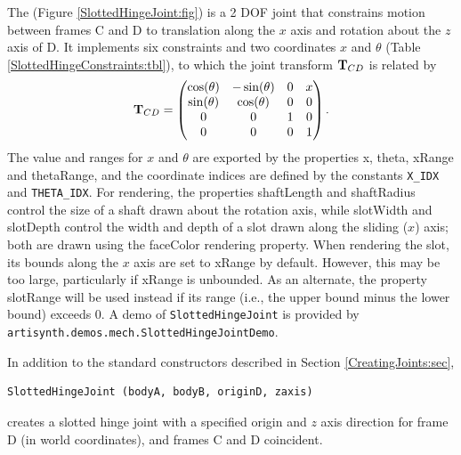 The  
(Figure \ref{SlottedHingeJoint:fig}) is
a 2 DOF joint that constrains motion between frames C and D to
translation along the $x$ axis and rotation about the $z$ axis of D.
It implements six constraints and two coordinates $x$ and $\theta$
(Table \ref{SlottedHingeConstraints:tbl}), to which the joint
transform ${\bf T}_{CD}$ is related by
%
\begin{equation}
{\bf T}_{CD} = \left(\begin{matrix}
\cos(\theta) & -\sin(\theta) & 0 & x \\
\sin(\theta) &  \cos(\theta) & 0 & 0 \\
0 & 0 & 1 & 0 \\
0 & 0 & 0 & 1 
\end{matrix}\right).
\label{SlottedHingeTCD:eqn}
\end{equation}
The value and ranges for $x$ and $\theta$ are exported by the
properties {\sf x}, {\sf theta}, {\sf xRange} and {\sf thetaRange},
and the coordinate indices are defined by the constants {\tt X\_IDX}
and {\tt THETA\_IDX}. For rendering, the properties {\sf shaftLength}
and {\sf shaftRadius} control the size of a shaft drawn about the
rotation axis, while {\sf slotWidth} and {\sf slotDepth} control the
width and depth of a slot drawn along the sliding ($x$) axis; both are
drawn using the {\sf faceColor} rendering property. When rendering the
slot, its bounds along the $x$ axis are set to {\sf xRange} by
default. However, this may be too large, particularly if {\sf xRange}
is unbounded. As an alternate, the property {\sf slotRange} will be
used instead if its range (i.e., the upper bound minus the lower
bound) exceeds 0.  A demo of {\tt SlottedHingeJoint} is provided by
{\tt artisynth.demos.mech.SlottedHingeJointDemo}.

In addition to the standard constructors described in
Section \ref{CreatingJoints:sec},
%
\begin{lstlisting}[]
  SlottedHingeJoint (bodyA, bodyB, originD, zaxis)
\end{lstlisting}
%
creates a slotted hinge joint with a specified origin and $z$ axis direction
for frame D (in world coordinates), and frames C and D coincident.


